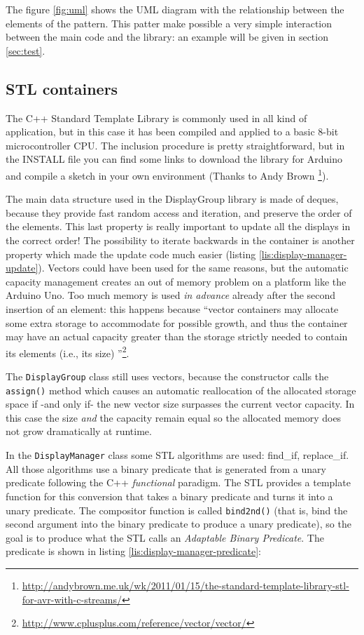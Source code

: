 \documentclass[11pt,english]{article}
\newcommand{\code}[1]{\texttt{#1}}
\begin{document}
The figure \ref{fig:uml} shows the UML diagram with the relationship between the elements of the pattern.
This patter make possible a very simple interaction between the main code and the library: an example will be 
given in section \ref{sec:test}.


\subsection{STL containers}\label{subsec:stl}

The C++ Standard Template Library is commonly used in all kind of application, but in this case it has been 
compiled and applied to a basic 8-bit microcontroller CPU. The inclusion procedure is pretty straightforward, 
but in the INSTALL file you can find some links to download the library for Arduino and compile a sketch in 
your own environment (Thanks to Andy Brown 
\footnote{\url{http://andybrown.me.uk/wk/2011/01/15/the-standard-template-library-stl-for-avr-with-c-streams/}}).

The main data structure used in the DisplayGroup library is made of deques, because they provide fast random 
access and iteration, and preserve the order of the elements. This last property is really important to 
update all the displays in the correct order!
The possibility to iterate backwards in the container is another property which made the update code much 
easier (listing \ref{lis:display-manager-update}). Vectors could have been used for the same reasons, but the 
automatic capacity management creates an out of memory problem on a platform like the Arduino Uno. Too much 
memory is used \emph{in advance} already after the second insertion of an element: this 
happens because \textquotedblleft vector containers may allocate some extra storage to accommodate for possible 
growth, and thus the container may have an actual capacity greater than the storage strictly needed to contain 
its elements (i.e., its size) \textquotedblright \footnote{\url{http://www.cplusplus.com/reference/vector/vector/}}.

The \code{DisplayGroup} class still uses vectors, because the constructor calls the \code{assign()} method which 
causes an automatic reallocation of the allocated storage space if -and only if- the new vector size surpasses the 
current vector capacity. In this case the size \emph{and} the capacity remain equal so the allocated memory 
does not grow dramatically at runtime.

In the \code{DisplayManager} class some STL algorithms are used: find\_if, replace\_if. All those 
algorithms use a binary predicate that is generated from a unary predicate following the C++ \emph{functional} 
paradigm.
The STL provides a template function for this conversion that takes a binary predicate and turns it into a 
unary predicate. The compositor function is called \code{bind2nd()} (that is, bind the second argument into 
the binary predicate to produce a unary predicate), so the goal is to produce what the STL calls an 
\emph{Adaptable Binary Predicate}.
The predicate is shown in listing \ref{lis:display-manager-predicate}:
\end{document}

